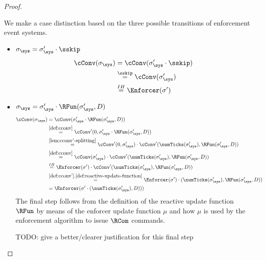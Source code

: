 \begin{proof}
\begin{itemize}
        We make a case distinction based on the three possible transitions
        of enforcement event systems.
        \begin{itemize}
            \item $\sigma_\sys = \sigma_\sys' \cdot \sskip$
            \begin{align*}
                \cConv(\sigma_\sys) &= \cConv(\sigma_\sys' \cdot \sskip) \\
                &\stackrel{\sskip}{=} \cConv(\sigma_\sys') \\
                &\stackrel{IH}{=} \Enforcer(\sigma')
            \end{align*}
            \item $\sigma_\sys = \sigma_\sys' \cdot \RFun(\sigma_\sys', D)$
            \begin{align*}
                \cConv(\sigma_\sys)
                &= \cConv(\sigma_\sys' \cdot \RFun(\sigma_\sys', D)) \\
                &\stackrel{\ref{def:cconv}}{=}
                    \cConv'(0, \sigma_\sys' \cdot \RFun(\sigma_\sys', D)) \\
                &\stackrel{\ref{lem:cconv'-splitting}}{=}
                    \cConv'(0, \sigma_\sys') \cdot
                    \cConv'(\numTicks(\sigma_\sys'), \RFun(\sigma_\sys', D)) \\
                &\stackrel{\ref{def:cconv}}{=}
                    \cConv(\sigma_\sys') \cdot
                    \cConv'(\numTicks(\sigma_\sys'), \RFun(\sigma_\sys', D)) \\
                &\stackrel{IH}{=}
                    \Enforcer(\sigma') \cdot
                    \cConv'(\numTicks(\sigma_\sys'), \RFun(\sigma_\sys', D)) \\
                &\stackrel{\ref{def:cconv'}, \ref{def:reactive-update-function}}{=}
                    \Enforcer(\sigma') \cdot
                    (\numTicks(\sigma_\sys'), \RFun(\sigma_\sys', D)) \\
                &=
                    \Enforcer(\sigma' \cdot
                    (\numTicks(\sigma_\sys'),  D)))
            \end{align*}
            The final step follows from the definition of the
            reactive update function $\RFun$ by means of the enforcer
            update function $\mu$ and how $\mu$ is used by
            the enforcement algorithm to issue $\RCom$ commands.

            TODO: give a better/clearer justification for this final step


\end{itemize}
\end{itemize}
\end{proof}
